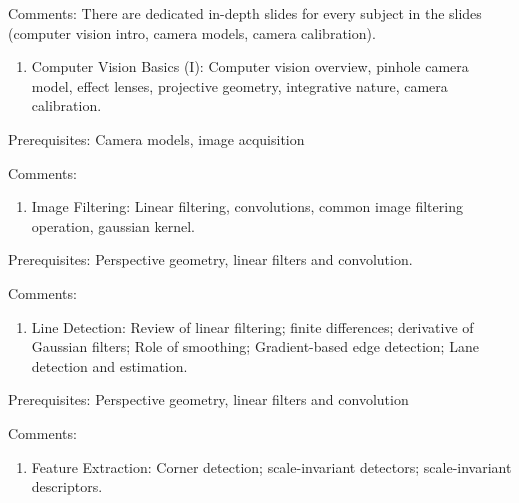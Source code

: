 \documentclass[12pt]{article}
\begin{document}
Comments: There are dedicated in-depth slides for every subject in the slides (computer vision intro, camera models, camera calibration).

\begin{enumerate}

	\item Computer Vision Basics (I): Computer vision overview, pinhole camera model, effect lenses, projective geometry, integrative nature, camera calibration. 

\end{enumerate}


Prerequisites: Camera models, image acquisition

Comments: 

\begin{enumerate}

	\item Image Filtering: Linear filtering, convolutions, common image filtering operation, gaussian kernel.

\end{enumerate}


Prerequisites: Perspective geometry, linear filters and convolution.

Comments: 

\begin{enumerate}

	\item Line Detection: Review of linear filtering; finite differences; derivative of Gaussian filters; Role of smoothing; Gradient-based edge detection; Lane detection and estimation.

\end{enumerate}


Prerequisites: Perspective geometry, linear filters and convolution 

Comments: 

\begin{enumerate}

	\item Feature Extraction: Corner detection; scale-invariant detectors; scale-invariant descriptors. 

\end{enumerate}
\end{document}
